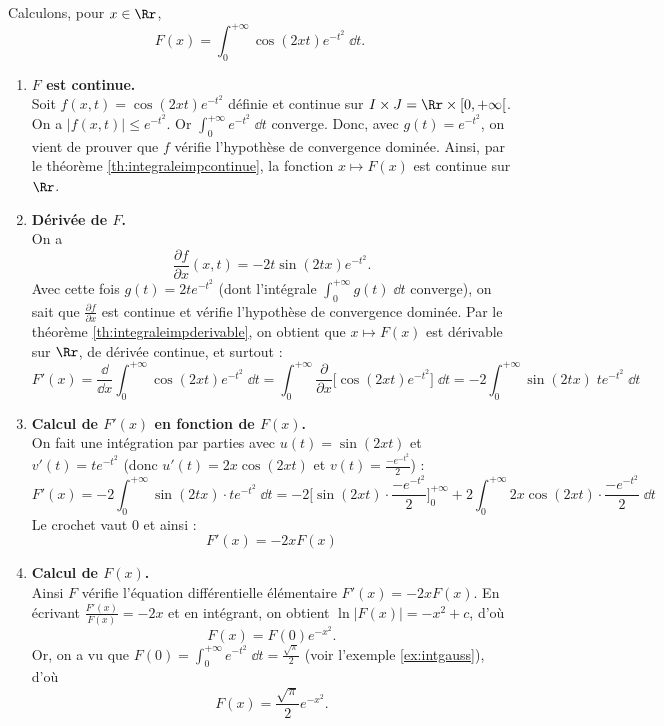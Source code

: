 \documentclass[class=report,crop=false]{standalone}
\begin{document}
\begin{exemple}
Calculons, pour $x\in \Rr$,
$$F(x) = \int_0^{+\infty} \cos(2xt)e^{-t^2} \; \dd t.$$

\begin{enumerate}
  \item \textbf{$F$ est continue.}\\
  Soit $f(x,t) = \cos(2xt)e^{-t^2}$ définie et continue sur $I \times J = \Rr \times [0,+\infty[$.
  On a $\big| f(x,t) \big| \le e^{-t^2}$. Or $\int_0^{+\infty} e^{-t^2} \; \dd t$ converge.
  Donc, avec $g(t) = e^{-t^2}$, on vient de prouver que $f$ vérifie 
  l'hypothèse de convergence dominée. Ainsi, par le théorème \ref{th:integraleimpcontinue},
  la fonction $x\mapsto F(x)$ est continue sur $\Rr$.
  
  
  \item \textbf{Dérivée de $F$.}\\
  On a 
  $$\frac{\partial f}{\partial x}(x,t) = -2t\sin(2tx)e^{-t^2}.$$
  Avec cette fois $g(t) = 2te^{-t^2}$ (dont l'intégrale $\int_0^{+\infty} g(t)\;\dd t$ converge),
  on sait que $\frac{\partial f}{\partial x}$ est continue et vérifie l'hypothèse de convergence dominée.
  Par le théorème \ref{th:integraleimpderivable}, on obtient que $x\mapsto F(x)$ est dérivable
  sur $\Rr$, de dérivée continue, et surtout :
  $$F'(x) 
  = \frac{\dd}{\dd x}  \int_0^{+\infty} \cos(2xt)e^{-t^2} \; \dd t
  = \int_0^{+\infty} \frac{\partial }{\partial x} \big[\cos(2xt)e^{-t^2}\big] \; \dd t
  = -2\int_0^{+\infty}\sin(2tx)\;te^{-t^2}\; \dd t$$
  
  \item \textbf{Calcul de $F'(x)$ en fonction de $F(x)$.}\\
  On fait une intégration par parties avec $u(t) = \sin(2xt)$
  et $v'(t) = te^{-t^2}$ (donc $u'(t) = 2x\cos(2xt)$ et 
  $v(t) =\frac{-e^{-t^2}}{2}$) :
  $$F'(x)
  = -2\int_0^{+\infty}\sin(2tx) \cdot te^{-t^2}\; \dd t
  = -2 \Big[ \sin(2xt) \cdot \frac{-e^{-t^2}}{2}\Big]_{0}^{+\infty} 
  +2 \int_0^{+\infty} 2x\cos(2xt) \cdot \frac{-e^{-t^2}}{2}\; \dd t$$
  Le crochet vaut $0$ et ainsi :
  $$F'(x) = -2x F(x)$$
  
  \item \textbf{Calcul de $F(x)$.}\\ 
  Ainsi $F$ vérifie l'équation différentielle élémentaire $F'(x) = -2x F(x)$.
  En écrivant
  $\frac{F'(x)}{F(x)} = -2x$ et en intégrant, on obtient $\ln \big|F(x)\big| = -x^2 + c$,
  d'où
  $$F(x) = F(0)e^{-x^2}.$$
  Or, on a vu que $F(0) = \int_0^{+\infty}e^{-t^2}\; \dd t = \frac{\sqrt \pi}{2}$ (voir l'exemple
  \ref{ex:intgauss}), d'où 
  $$F(x) =  \frac{\sqrt \pi}{2}e^{-x^2}.$$ 
  
\end{enumerate}
\end{exemple}
\end{document}
